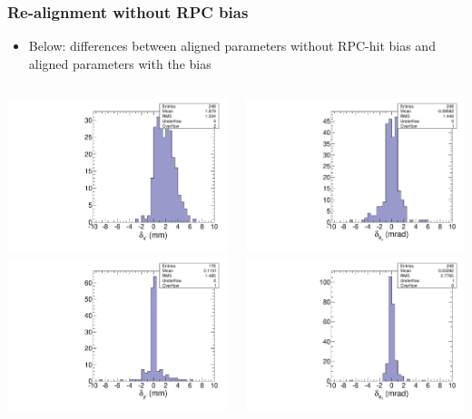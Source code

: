 \documentclass[compress]{beamer}
\begin{document}
\begin{frame}
\frametitle{Re-alignment without RPC bias}

\begin{itemize}
\item Below: differences between aligned parameters without RPC-hit bias and aligned parameters with the bias
\end{itemize}

\begin{columns}
\includegraphics[width=0.5\linewidth]{01_deltax_with_and_without_RPC.pdf}
\includegraphics[width=0.5\linewidth]{02_deltay_with_and_without_RPC.pdf}

\includegraphics[width=0.5\linewidth]{03_deltaphiy_with_and_without_RPC.pdf}
\includegraphics[width=0.5\linewidth]{04_deltaphiz_with_and_without_RPC.pdf}


\end{columns}
\end{frame}
\end{document}
